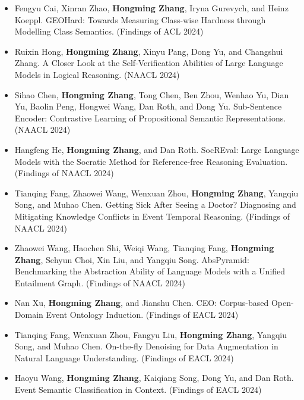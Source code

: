 \begin{itemize}[leftmargin=*, itemsep=0.35em, topsep=0.2em]
\begin{itemize}[leftmargin=1.5em, itemsep=0.2em, topsep=0.1em]
    \item Fengyu Cai, Xinran Zhao, \textbf{Hongming Zhang}, Iryna Gurevych, and Heinz Koeppl. GEOHard: Towards Measuring Class-wise Hardness through Modelling Class Semantics. (Findings of ACL 2024)
    \item Ruixin Hong, \textbf{Hongming Zhang}, Xinyu Pang, Dong Yu, and Changshui Zhang. A Closer Look at the Self-Verification Abilities of Large Language Models in Logical Reasoning. (NAACL 2024)
    \item Sihao Chen, \textbf{Hongming Zhang}, Tong Chen, Ben Zhou, Wenhao Yu, Dian Yu, Baolin Peng, Hongwei Wang, Dan Roth, and Dong Yu. Sub-Sentence Encoder: Contrastive Learning of Propositional Semantic Representations. (NAACL 2024)
    \item Hangfeng He, \textbf{Hongming Zhang}, and Dan Roth. SocREval: Large Language Models with the Socratic Method for Reference-free Reasoning Evaluation. (Findings of NAACL 2024)
    \item Tianqing Fang, Zhaowei Wang, Wenxuan Zhou, \textbf{Hongming Zhang}, Yangqiu Song, and Muhao Chen. Getting Sick After Seeing a Doctor? Diagnosing and Mitigating Knowledge Conflicts in Event Temporal Reasoning. (Findings of NAACL 2024)
    \item Zhaowei Wang, Haochen Shi, Weiqi Wang, Tianqing Fang, \textbf{Hongming Zhang}, Sehyun Choi, Xin Liu, and Yangqiu Song. AbsPyramid: Benchmarking the Abstraction Ability of Language Models with a Unified Entailment Graph. (Findings of NAACL 2024)
    \item Nan Xu, \textbf{Hongming Zhang}, and Jianshu Chen. CEO: Corpus-based Open-Domain Event Ontology Induction. (Findings of EACL 2024)
    \item Tianqing Fang, Wenxuan Zhou, Fangyu Liu, \textbf{Hongming Zhang}, Yangqiu Song, and Muhao Chen. On-the-fly Denoising for Data Augmentation in Natural Language Understanding. (Findings of EACL 2024)
    \item Haoyu Wang, \textbf{Hongming Zhang}, Kaiqiang Song, Dong Yu, and Dan Roth. Event Semantic Classification in Context. (Findings of EACL 2024)
  \end{itemize}


\end{itemize}
